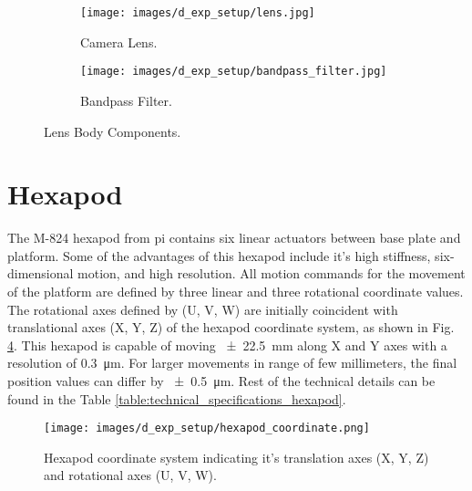    \begin{figure}[h]
        \begin{subfigure}{0.5\textwidth}
            \centering
            \texttt{[image: images/d\_exp\_setup/lens.jpg]}
            \caption{Camera Lens. \cite{edmund_optics_lens}}
            \label{fig:lens.jpg}
        \end{subfigure}
        \begin{subfigure}{0.5\textwidth}
            \centering
            \texttt{[image: images/d\_exp\_setup/bandpass\_filter.jpg]}
            \caption{Bandpass Filter. \cite{thorlabs_bandpass_filter}}
            \label{fig:bandpass_filter.jpg}
        \end{subfigure}
        \caption{Lens Body Components.}
        \label{fig:lens_body.jpg}
    \end{figure}

\section*{Hexapod}
The M-824 hexapod from \gls{pi} contains six linear actuators between base plate and platform. Some of the advantages of this hexapod include it's high stiffness, six-dimensional motion, and high resolution. All motion commands for the movement of the platform are defined by three linear and three rotational coordinate values. The rotational axes defined by (U, V, W) are initially coincident with translational axes (X, Y, Z) of the hexapod coordinate system, as shown in Fig. \ref{fig:hexapod_coordinate.png}. This hexapod is capable of moving \SI{\pm22.5}{\milli\meter} along X and Y axes with a resolution of \SI{0.3}{\micro\meter}. For larger movements in range of few millimeters, the final position values can differ by \SI{\pm0.5}{\micro\meter}. Rest of the technical details can be found in the Table \ref{table:technical_specifications_hexapod}.

\begin{figure}[h]
    \centering
    \texttt{[image: images/d\_exp\_setup/hexapod\_coordinate.png]}
    \caption{Hexapod coordinate system indicating it's translation axes (X, Y, Z) and rotational axes (U, V, W). \cite{hexapod_manual}}
    \label{fig:hexapod_coordinate.png}
\end{figure}

